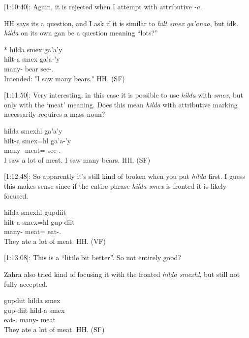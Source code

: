 [1:10:40]: Again, it is rejected when I attempt with attributive \textit{-a}.

HH says its a question, and I ask if it is similar to \textit{hilt smex ga'anaa}, but idk. \textit{hilda} on its own gan be a question meaning ``lots?''

\begin{exe}
    \ex \glll
    * hilda smex ga'a'y \\
    {} hilt-a smex ga'a-'y\\
    {} many-\Attr{} bear see-\Fsg{}.\Ii{} \\
    \glt Intended: "I saw many bears." \hfill HH.\ElicitationDate{} (SF)
\end{exe}

[1:11:50]: Very interesting, in this case it is possible to use \textit{hilda} with \textit{smex}, but only with the `meat' meaning. Does this mean \textit{hilda} with attributive marking necessarily requires a mass noun?

\begin{exe}
    \ex \glll
    hilda smexhl ga'a'y \\
    hilt-a smex=hl ga'a-'y\\
    many-\Attr{} meat=\Cn{} see-\Fsg{}.\Ii{} \\
    \glt \cmark  I saw a lot of meat. \xmark  I saw many bears.  \hfill HH.\ElicitationDate{} (SF)
\end{exe}

[1:12:48]: So apparently it's still kind of broken when you put \textit{hilda} first. I guess this makes sense since if the entire phrase \textit{hilda smex} is fronted it is likely focused.

\begin{exe}
    \ex \glll
    hilda smexhl gupdiit \\
    hilt-a smex=hl gup-diit \\
    many-\Attr{} meat=\Cn{} eat-\Tpl{}.\Ii{} \\
    \glt They ate a lot of meat.  \hfill HH.\ElicitationDate{} (VF)
\end{exe}

[1:13:08]: This is a ``little bit better''. So not entirely good?

Zahra also tried kind of focusing it with the fronted \textit{hilda smexhl}, but still not fully accepted.

\begin{exe}
    \ex \glll
    gupdiit hilda smex  \\
    gup-diit hild-a smex \\
    eat-\Tpl{}.\Ii{} many-\Attr{} meat \\
    \glt They ate a lot of meat.  \hfill HH.\ElicitationDate{} (SF)
\end{exe}

